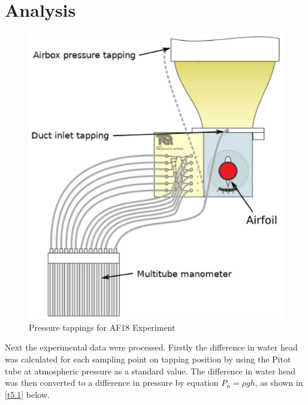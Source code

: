 \section{Analysis}
\FloatBarrier %

\begin{figure}[htb] %
    \centering
    \includegraphics[scale=0.45]{fig/AF18.png}
    \caption{Pressure tappings for AF18 Experiment}
    \label{demo}
\end{figure}


Next the experimental data were processed. Firstly the difference in water head was calculated for each sampling point on tapping position by using the Pitot tube at atmospheric pressure as a standard value. The difference in water head was then converted to a difference in pressure by equation $P_n=\rho gh$, as shown in \autoref{t5.1} below.



